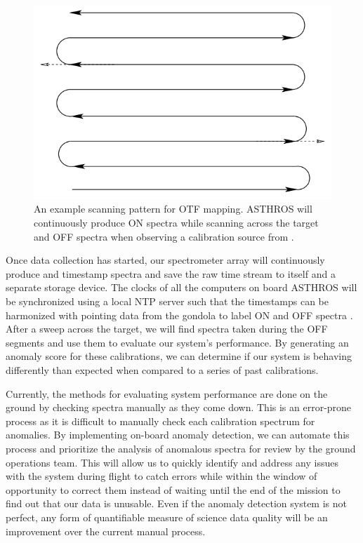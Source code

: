 \begin{figure}
    \centering
    \includegraphics[width=0.5\linewidth]{figs/spectra/scan.png}
    \caption[On-the-Fly Mapping Scanning Pattern Demonstrating On and Off Observations]{An example scanning pattern for OTF mapping. ASTHROS will continuously produce ON spectra while scanning across the target and OFF spectra when observing a calibration source from \parencite{mangum2007fly}.}
    \label{spectra/fig:scan}
\end{figure}

Once data collection has started, our spectrometer array will continuously produce and timestamp spectra and save the raw time stream to itself and a separate storage device. 
The clocks of all the computers on board ASTHROS will be synchronized using a local NTP server such that the timestamps can be harmonized with pointing data from the gondola to label ON and OFF spectra \parencite{mills1991internet}.
After a sweep across the target, we will find spectra taken during the OFF segments and use them to evaluate our system's performance.
By generating an anomaly score for these calibrations, we can determine if our system is behaving differently than expected when compared to a series of past calibrations.

Currently, the methods for evaluating system performance are done on the ground by checking spectra manually as they come down.
This is an error-prone process as it is difficult to manually check each calibration spectrum for anomalies.
By implementing on-board anomaly detection, we can automate this process and prioritize the analysis of anomalous spectra for review by the ground operations team.
This will allow us to quickly identify and address any issues with the system during flight to catch errors while within the window of opportunity to correct them instead of waiting until the end of the mission to find out that our data is unusable.
Even if the anomaly detection system is not perfect, any form of quantifiable measure of science data quality will be an improvement over the current manual process.



